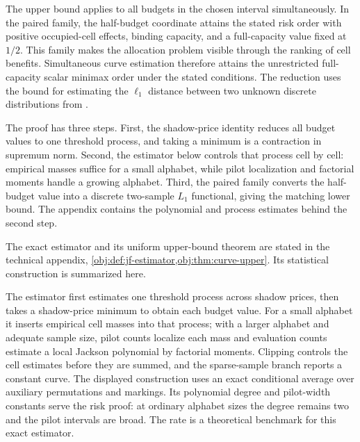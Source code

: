 The upper bound applies to all budgets in the chosen interval simultaneously. In the paired family, the half-budget coordinate attains the stated risk order with positive occupied-cell effects, binding capacity, and a full-capacity value fixed at \(1/2\). This family makes the allocation problem visible through the ranking of cell benefits. Simultaneous curve estimation therefore attains the unrestricted full-capacity scalar minimax order under the stated conditions. The reduction uses the bound for estimating the \(\ell_1\) distance between two unknown discrete distributions from \citet[Theorem~3 and the unknown-both-distributions reduction following Theorem~6]{JiaoHanWeissman2018}.

The proof has three steps. First, the shadow-price identity reduces all budget values to one threshold process, and taking a minimum is a contraction in supremum norm. Second, the estimator below controls that process cell by cell: empirical masses suffice for a small alphabet, while pilot localization and factorial moments handle a growing alphabet. Third, the paired family converts the half-budget value into a discrete two-sample \(L_1\) functional, giving the matching lower bound. The appendix contains the polynomial and process estimates behind the second step.

The exact estimator and its uniform upper-bound theorem are stated in the technical appendix, \cref{obj:def:jf-estimator,obj:thm:curve-upper}. Its statistical construction is summarized here.



The estimator first estimates one threshold process across shadow prices, then takes a shadow-price minimum to obtain each budget value. For a small alphabet it inserts empirical cell masses into that process; with a larger alphabet and adequate sample size, pilot counts localize each mass and evaluation counts estimate a local Jackson polynomial by factorial moments. Clipping controls the cell estimates before they are summed, and the sparse-sample branch reports a constant curve. The displayed construction uses an exact conditional average over auxiliary permutations and markings. Its polynomial degree and pilot-width constants serve the risk proof: at ordinary alphabet sizes the degree remains two and the pilot intervals are broad. The rate is a theoretical benchmark for this exact estimator.

